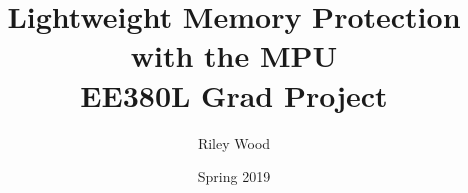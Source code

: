 \documentclass[]{report}
\begin{document}
\title{Lightweight Memory Protection with the MPU \\
    \large EE380L Grad Project}
\author{Riley Wood}
\date{Spring 2019}
\maketitle













% 
% 
\end{document}
